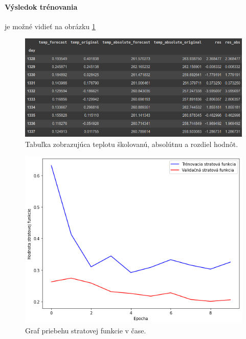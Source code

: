 \newpage
\paragraph{Výsledok trénovania} je možné vidieť na obrázku \ref{tabhondot}
\begin{figure}[!htbp]
  \centering
  \includegraphics[width=13cm]{img/tabulka_hodnot.png}
  \caption{Tabuľka zobrazujúca teplotu školovanú, absolútnu a rozdiel hodnôt.}
  \label{tabhondot}
\end{figure}


\begin{figure}[!htbp]
  \centering
  \includegraphics[width=14cm]{img/loss.png}
  \caption{Graf priebehu stratovej funkcie v čase.}
  \label{lossfunction}
\end{figure}

